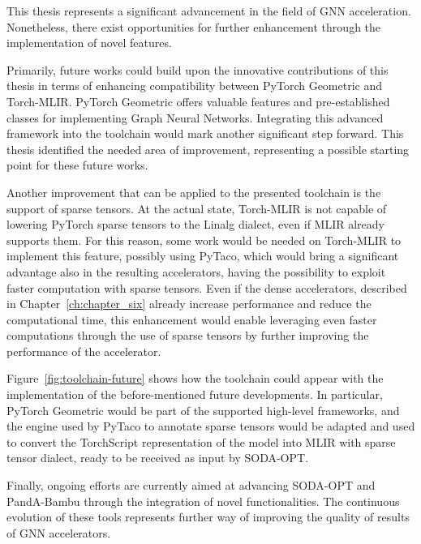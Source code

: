 This thesis represents a significant advancement in the field of GNN acceleration.
Nonetheless, there exist opportunities for further enhancement through the implementation of novel features.

Primarily, future works could build upon the innovative contributions of this thesis in terms of enhancing compatibility between PyTorch Geometric and Torch-MLIR\@.
PyTorch Geometric offers valuable features and pre-established classes for implementing Graph Neural Networks.
Integrating this advanced framework into the toolchain would mark another significant step forward.
This thesis identified the needed area of improvement, representing a possible starting point for these future works.

Another improvement that can be applied to the presented toolchain is the support of sparse tensors.
At the actual state, Torch-MLIR is not capable of lowering PyTorch sparse tensors to the Linalg dialect, even if MLIR already supports them.
For this reason, some work would be needed on Torch-MLIR to implement this feature, possibly using PyTaco, which would bring a significant advantage also in the resulting accelerators, having the possibility to exploit faster computation with sparse tensors.
Even if the dense accelerators, described in Chapter~\ref{ch:chapter_six} already increase performance and reduce the computational time, this enhancement would enable leveraging even faster computations through the use of sparse tensors by further improving the performance of the accelerator.

Figure~\ref{fig:toolchain-future} shows how the toolchain could appear with the implementation of the before-mentioned future developments.
In particular, PyTorch Geometric would be part of the supported high-level frameworks, and the engine used by PyTaco to annotate sparse tensors would be adapted and used to convert the TorchScript representation of the model into MLIR with sparse tensor dialect, ready to be received as input by SODA-OPT\@.

Finally, ongoing efforts are currently aimed at advancing SODA-OPT and PandA-Bambu through the integration of novel functionalities.
The continuous evolution of these tools represents further way of improving the quality of results of GNN accelerators.